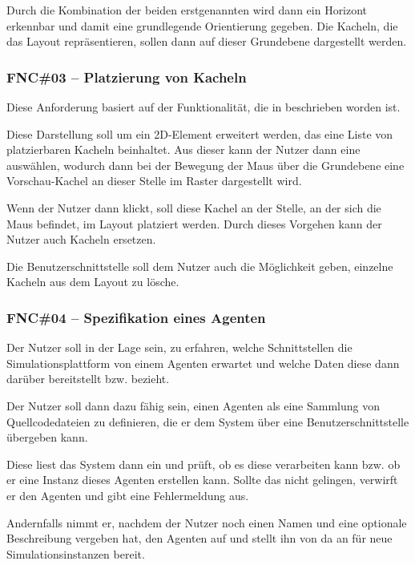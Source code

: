 Durch die Kombination der beiden erstgenannten wird dann ein Horizont erkennbar und damit eine grundlegende Orientierung gegeben.
Die Kacheln, die das Layout repräsentieren, sollen dann auf dieser Grundebene dargestellt werden.

\subsubsection{FNC\#03 – Platzierung von Kacheln} \label{fnc:configure_layout}

Diese Anforderung basiert auf der Funktionalität, die in  beschrieben worden ist.

Diese Darstellung soll um ein 2D-Element erweitert werden, das eine Liste von platzierbaren Kacheln beinhaltet.
Aus dieser kann der Nutzer dann eine auswählen, wodurch dann bei der Bewegung der Maus über die Grundebene eine Vorschau-Kachel an dieser Stelle im Raster dargestellt wird.

Wenn der Nutzer dann klickt, soll diese Kachel an der Stelle, an der sich die Maus befindet, im Layout platziert werden.
Durch dieses Vorgehen kann der Nutzer auch Kacheln ersetzen.

Die Benutzerschnittstelle soll dem Nutzer auch die Möglichkeit geben, einzelne Kacheln aus dem Layout zu lösche.

\subsubsection{FNC\#04 – Spezifikation eines Agenten} \label{fnc:specification_agent}

Der Nutzer soll in der Lage sein, zu erfahren, welche Schnittstellen die Simulationsplattform von einem Agenten erwartet und welche Daten diese dann darüber bereitstellt bzw. bezieht.

Der Nutzer soll dann dazu fähig sein, einen Agenten als eine Sammlung von Quellcodedateien zu definieren, die er dem System über eine Benutzerschnittstelle übergeben kann.

Diese liest das System dann ein und prüft, ob es diese verarbeiten kann bzw. ob er eine Instanz dieses Agenten erstellen kann.
Sollte das nicht gelingen, verwirft er den Agenten und gibt eine Fehlermeldung aus.

Andernfalls nimmt er, nachdem der Nutzer noch einen Namen und eine optionale Beschreibung vergeben hat, den Agenten auf und stellt ihn von da an für neue Simulationsinstanzen bereit.

